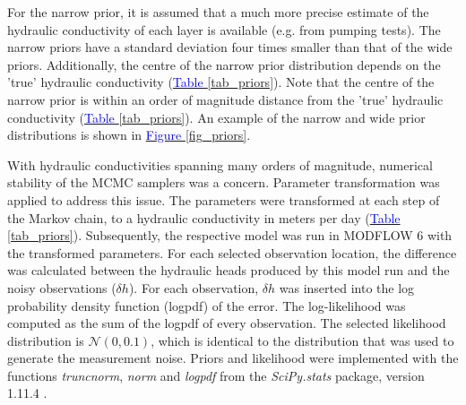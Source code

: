 
For the narrow prior, it is assumed that a much more precise estimate of the hydraulic conductivity of each layer is available (e.g. from pumping tests). The narrow priors have a standard deviation four times smaller than that of the wide priors. Additionally, the centre of the narrow prior distribution depends on the 'true' hydraulic conductivity (\hyperref[tab_priors]{\textcolor{blue}{Table }\ref{tab_priors}}). Note that the centre of the narrow prior is within an order of magnitude distance from the 'true' hydraulic conductivity (\hyperref[tab_priors]{\textcolor{blue}{Table }\ref{tab_priors}}). An example of the narrow and wide prior distributions is shown in \hyperref[fig_priors]{\textcolor{blue}{Figure }\ref{fig_priors}}. 

With hydraulic conductivities spanning many orders of magnitude, numerical stability of the MCMC samplers was a concern. Parameter transformation was applied to address this issue. The parameters were transformed at each step of the Markov chain, to a hydraulic conductivity in meters per day (\hyperref[tab_priors]{\textcolor{blue}{Table }\ref{tab_priors}}). 
Subsequently, the respective model was run in MODFLOW 6 with the transformed parameters. For each selected observation location, the difference was calculated between the hydraulic heads produced by this model run and the noisy observations ($\delta h$). For each observation, $\delta h$ was inserted into the log probability density function (logpdf) of the error. The log-likelihood was computed as the sum of the logpdf of every observation. The selected likelihood distribution is $\mathcal{N}(0,0.1)$, which is identical to the distribution that was used to generate the measurement noise. %
Priors and likelihood were implemented with the functions \textit{truncnorm}, \textit{norm} and \textit{logpdf} from the \textit{SciPy.stats} package, version 1.11.4 \citep{2020SciPy-NMeth}. %

